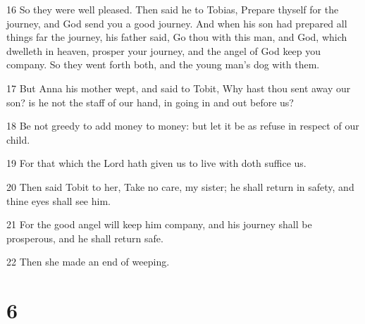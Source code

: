 \par 16 So they were well pleased. Then said he to Tobias, Prepare thyself for the journey, and God send you a good journey. And when his son had prepared all things far the journey, his father said, Go thou with this man, and God, which dwelleth in heaven, prosper your journey, and the angel of God keep you company. So they went forth both, and the young man's dog with them.
\par 17 But Anna his mother wept, and said to Tobit, Why hast thou sent away our son? is he not the staff of our hand, in going in and out before us?
\par 18 Be not greedy to add money to money: but let it be as refuse in respect of our child.
\par 19 For that which the Lord hath given us to live with doth suffice us.
\par 20 Then said Tobit to her, Take no care, my sister; he shall return in safety, and thine eyes shall see him.
\par 21 For the good angel will keep him company, and his journey shall be prosperous, and he shall return safe.
\par 22 Then she made an end of weeping.

\chapter{6}

